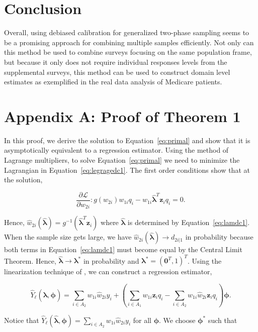 \documentclass[12pt]{article}
\renewcommand{\bf}[1]{\mathbf{#1}}
\begin{document}
\section{Conclusion}

Overall, using debiased calibration for generalized two-phase sampling seems to
be a promising approach for combining multiple samples efficiently. Not only can
this method be used to combine surveys focusing on the same population frame,
but because it only does not require individual responses levels from the
supplemental surveys, this method can be used to construct domain level
estimates as exemplified in the real data analysis of Medicare patients.




\newpage

\section*{Appendix A: Proof of Theorem 1}

In this proof, we derive the solution to Equation~\ref{eq:primal} and show
that it is asymptotically equivalent to a regression estimator. Using the
method of Lagrange multipliers, to solve Equation~\eqref{eq:primal} we need to
minimize the Lagrangian in Equation~\eqref{eq:legragedc1}. 
The first order conditions show that at the solution,

$$
\frac{\partial \mathcal{L}}{\partial w_{2i}}: g(w_{2i}) w_{1i}q_i -
w_{1i} \hat{\bm \lambda}^T \bf z_i q_i = 0.
$$

Hence, $\hat w_{2i}(\hat{\bm \lambda}) = 
g^{-1}(\hat{\bm \lambda}^T \bf z_i)$ where
$\hat{\bm \lambda}$ is determined by Equation~\eqref{eq:lamdc1}. When the
sample size gets large, we have $\hat w_{2i}(\hat{\bm \lambda}) \to
d_{2i|1}$ in probability because both terms in Equation~\eqref{eq:lamdc1} must
become equal by the Central Limit Theorem. Hence,
$\hat{\bm \lambda} \to \bm \lambda^*$ in probability and 
$\bm \lambda^* = (\bf 0^T, 1)^T$. 
Using the linearization technique of
\cite{randles1982asymptotic}, we can construct a regression estimator, 

$$
\hat Y_\ell(\hat{\bm \lambda}, \bm \phi) = 
\sum_{i \in A_2} w_{1i} \hat w_{2i} y_i + 
\left(\sum_{i \in A_1} w_{1i} \bm z_i q_i - \sum_{i \in A_2} w_{1i} 
\hat w_{2i} \bf z_i q_i\right)\bm \phi.
$$

Notice that $\hat Y_\ell(\hat{\bm \lambda}, \bm \phi) = \sum_{i \in A_2} w_{1i}
\hat w_{2i} y_i$ for all $\bm \phi$. We choose $\bm \phi^*$ such that
\end{document}
